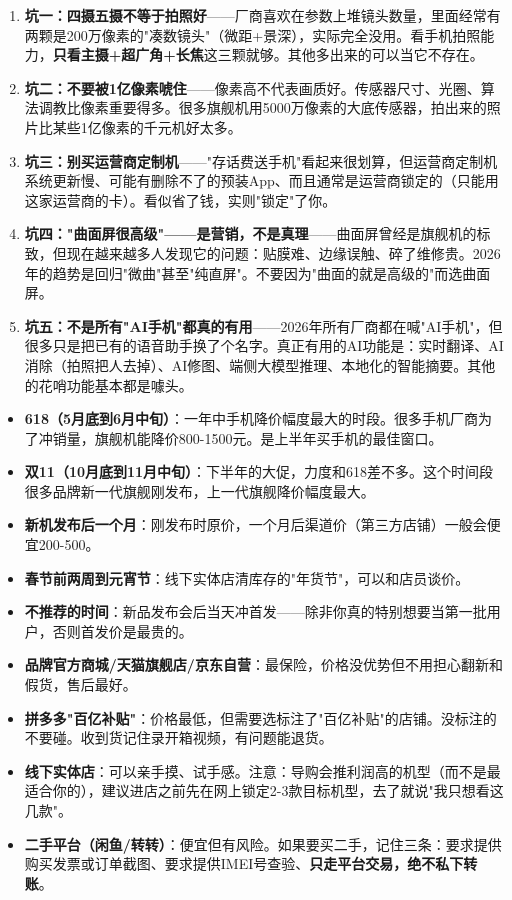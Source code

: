 \begin{enumerate}
  \item \textbf{坑一：四摄五摄不等于拍照好}——厂商喜欢在参数上堆镜头数量，里面经常有两颗是200万像素的"凑数镜头"（微距+景深），实际完全没用。看手机拍照能力，\textbf{只看主摄+超广角+长焦}这三颗就够。其他多出来的可以当它不存在。
  \item \textbf{坑二：不要被1亿像素唬住}——像素高不代表画质好。传感器尺寸、光圈、算法调教比像素重要得多。很多旗舰机用5000万像素的大底传感器，拍出来的照片比某些1亿像素的千元机好太多。
  \item \textbf{坑三：别买运营商定制机}——"存话费送手机"看起来很划算，但运营商定制机系统更新慢、可能有删除不了的预装App、而且通常是运营商锁定的（只能用这家运营商的卡）。看似省了钱，实则"锁定"了你。
  \item \textbf{坑四："曲面屏很高级"——是营销，不是真理}——曲面屏曾经是旗舰机的标致，但现在越来越多人发现它的问题：贴膜难、边缘误触、碎了维修贵。2026年的趋势是回归"微曲"甚至"纯直屏"。不要因为"曲面的就是高级的"而选曲面屏。
  \item \textbf{坑五：不是所有"AI手机"都真的有用}——2026年所有厂商都在喊"AI手机"，但很多只是把已有的语音助手换了个名字。真正有用的AI功能是：实时翻译、AI消除（拍照把人去掉）、AI修图、端侧大模型推理、本地化的智能摘要。其他的花哨功能基本都是噱头。
\end{enumerate}


\begin{itemize}
  \item \textbf{618（5月底到6月中旬）}：一年中手机降价幅度最大的时段。很多手机厂商为了冲销量，旗舰机能降价800-1500元。是上半年买手机的最佳窗口。
  \item \textbf{双11（10月底到11月中旬）}：下半年的大促，力度和618差不多。这个时间段很多品牌新一代旗舰刚发布，上一代旗舰降价幅度最大。
  \item \textbf{新机发布后一个月}：刚发布时原价，一个月后渠道价（第三方店铺）一般会便宜200-500。
  \item \textbf{春节前两周到元宵节}：线下实体店清库存的"年货节"，可以和店员谈价。
  \item \textbf{不推荐的时间}：新品发布会后当天冲首发——除非你真的特别想要当第一批用户，否则首发价是最贵的。
\end{itemize}


\begin{itemize}
  \item \textbf{品牌官方商城/天猫旗舰店/京东自营}：最保险，价格没优势但不用担心翻新和假货，售后最好。
  \item \textbf{拼多多"百亿补贴"}：价格最低，但需要选标注了"百亿补贴"的店铺。没标注的不要碰。收到货记住录开箱视频，有问题能退货。
  \item \textbf{线下实体店}：可以亲手摸、试手感。注意：导购会推利润高的机型（而不是最适合你的），建议进店之前先在网上锁定2-3款目标机型，去了就说"我只想看这几款"。
  \item \textbf{二手平台（闲鱼/转转）}：便宜但有风险。如果要买二手，记住三条：要求提供购买发票或订单截图、要求提供IMEI号查验、\textbf{只走平台交易，绝不私下转账}。
\end{itemize}

